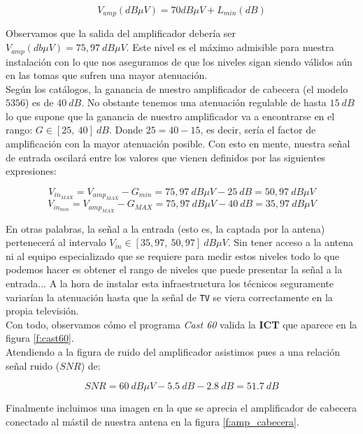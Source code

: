 \documentclass{article}[12 pt]
\begin{document}
			$$V_{amp}(dB\mu V) = 70 dB\mu V + L_{min}(dB)$$

			Observamos que la salida del amplificador debería ser $V_{amp}(db\mu V) = 75,97\ dB\mu V$. Este nivel es el máximo admisible para nuestra instalación con lo que nos aseguramos de que los niveles sigan siendo válidos aún en las tomas que sufren una mayor atenuación.\\

			Según los catálogos, la ganancia de nuestro amplificador de cabecera (el modelo $5356$) es de $40\ dB$. No obstante tenemos una atenuación regulable de hasta $15\ dB$ lo que supone que la ganancia de nuestro amplificador va a encontrarse en el rango: $G \in [25,\ 40]\ dB$. Donde $25 = 40 - 15$, es decir, sería el factor de amplificación con la mayor atenuación posible. Con esto en mente, nuestra señal de entrada oscilará entre los valores que vienen definidos por las siguientes expresiones:

			$$V_{in_{MAX}} = V_{amp_{MAX}} - G_{min} = 75,97\ dB\mu V - 25\ dB = 50,97\ dB\mu V$$
			$$V_{in_{min}} = V_{amp_{MAX}} - G_{MAX} = 75,97\ dB\mu V - 40\ dB = 35,97\ dB\mu V$$

			En otras palabras, la señal a la entrada (esto es, la captada por la antena) pertenecerá al intervalo $V_{in} \in [35,97,\ 50,97]\ dB\mu V$. Sin tener acceso a la antena ni al equipo especializado que se requiere para medir estos niveles todo lo que podemos hacer es obtener el rango de niveles que puede presentar la señal a la entrada... A la hora de instalar esta infraestructura los técnicos seguramente variarían la atenuación hasta que la señal de \texttt{TV} se viera correctamente en la propia televisión.\\

			Con todo, observamos cómo el programa \textit{Cast 60} valida la \textbf{ICT} que aparece en la figura \ref{f:cast60}.\\

			Atendiendo a la figura de ruido del amplificador asistimos pues a una relación señal ruido ($SNR$) de:

			$$SNR = 60\ dB\mu V - 5.5\ dB - 2.8\ dB = 51.7\ dB$$


			Finalmente incluimos una imagen en la que se aprecia el amplificador de cabecera conectado al mástil de nuestra antena en la figura \ref{f:amp_cabecera}.
\end{document}
